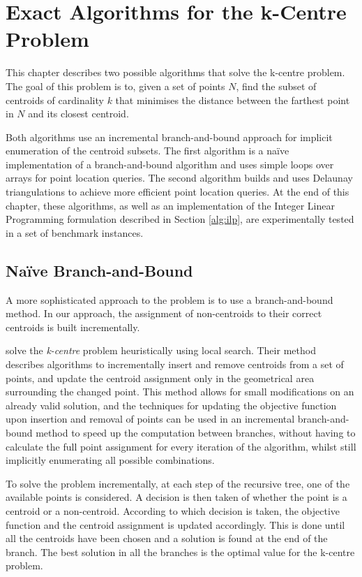 \cleardoublepage
\chapter{Exact Algorithms for the k-Centre Problem}
\label{chap:algos}

\begin{change}
This chapter describes two possible algorithms that solve the k-centre problem. The goal of this problem is to, given a set of points $N$, find the subset of centroids of cardinality $k$ that minimises the distance between the farthest point in $N$ and its closest centroid. 

Both algorithms use an incremental branch-and-bound approach for implicit enumeration of the centroid subsets. The first algorithm is a naïve implementation of a branch-and-bound algorithm and uses simple loops over arrays for point location queries. The second algorithm builds and uses Delaunay triangulations to achieve more efficient point location queries. At the end of this chapter, these algorithms, as well as an implementation of the Integer Linear Programming formulation described in Section \ref{alg:ilp}, are experimentally tested in a set of benchmark instances.

\end{change}
\section{Naïve Branch-and-Bound}
\label{alg:bb}

\begin{change}
A more sophisticated approach to the problem is to use a branch-and-bound method.
In our approach, the assignment of non-centroids to their correct centroids is built incrementally.

\citet{incrementalcov} solve the \emph{k-centre} problem heuristically using local search. Their method describes algorithms to incrementally insert and remove centroids from a set of points, and update the centroid assignment only in the geometrical area surrounding the changed point. This method allows for small modifications on an already valid solution, and the techniques for updating the objective function upon insertion and removal of points can be used in an incremental branch-and-bound method to speed up the computation between branches, without having to calculate the full point assignment for every iteration of the algorithm, whilst still implicitly enumerating all possible combinations. 

To solve the problem incrementally, at each step of the recursive tree, one of the available points is considered. A decision is then taken of whether the point is a centroid or a non-centroid. According to which decision is taken, the objective function and the centroid assignment is updated accordingly. This is done until all the centroids have been chosen and a solution is found at the end of the branch. The best solution in all the branches is the optimal value for the k-centre problem.
\end{change}

